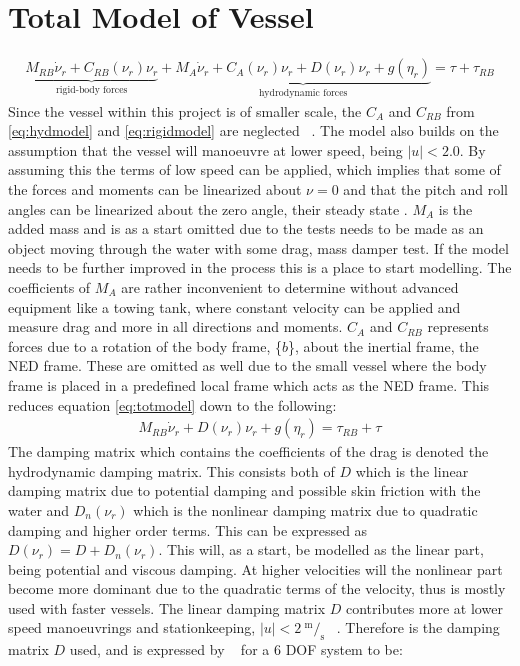 \section{Total Model of Vessel}
\begin{align}
\underbrace{M_{RB} \dot \nu_r + C_{RB}(\nu_r)\nu_r}_{\text{rigid-body forces}} + \underbrace{M_A \dot \nu_r + C_A(\nu_r)\nu_r + D(\nu_r)\nu_r + g(\eta_r)}_{\text{hydrodynamic forces}}  = \tau + \tau_{RB}
\label{eq:totmodel}
\end{align}
Since the vessel within this project is of smaller scale, the $C_A$ and $C_{RB}$ from \ref{eq:hydmodel} and \ref{eq:rigidmodel} are neglected ~\citep[eq. (2.23)]{fullactuatship}. The model also builds on the assumption that the vessel will manoeuvre at lower speed, being $|u| < 2.0$. By assuming this the terms of low speed can be applied, which implies that some of the forces and moments can be linearized about $\nu = 0$ and that the pitch and roll angles can be linearized about the zero angle, their steady state \citep[][p.174-175]{fossen}. $M_A$ is the added mass and is as a start omitted due to the tests needs to be made as an object moving through the water with some drag, mass damper test. If the model needs to be further improved in the process this is a place to start modelling. The coefficients of $M_A$ are rather inconvenient to determine without advanced equipment like a towing tank, where constant velocity can be applied and measure drag and more in all directions and moments. $C_A$ and $C_{RB}$ represents forces due to a rotation of the body frame, \{$b$\}, about the inertial frame, the NED frame. These are omitted as well due to the small vessel where the body frame is placed in a predefined local frame which acts as the NED frame. This reduces equation \ref{eq:totmodel} down to the following:
\begin{align}
M_{RB} \dot \nu_r + D(\nu_r)\nu_r + g(\eta_r) = \tau_{RB} + \tau
\label{eq:reducedmodel}
\end{align}
The damping matrix which contains the coefficients of the drag is denoted the hydrodynamic damping matrix. This consists both of $D$ which is the linear damping matrix due to potential damping and possible skin friction with the water and $D_n(\nu_r)$ which is the nonlinear damping matrix due to quadratic damping and higher order terms. This can be expressed as $D(\nu_r) = D + D_n(\nu_r)$. This will, as a start, be modelled as the linear part, being potential and viscous damping. At higher velocities will the nonlinear part become more dominant due to the quadratic terms of the velocity, thus is mostly used with faster vessels. The linear damping matrix $D$ contributes more at lower speed manoeuvrings and stationkeeping, $|u| < 2 \ ^\text{m}/_\text{s}$ ~\citep[fig. (7.2)]{fossen}. Therefore is the damping matrix $D$ used, and is expressed by ~\citep[eq. (6.62)]{fossen} for a 6 \ac{DOF} system to be:
